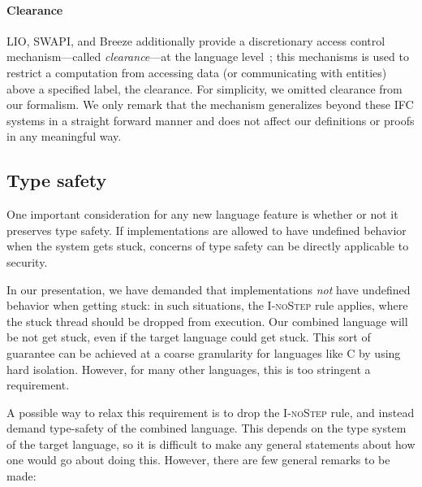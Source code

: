 \paragraph{Clearance}
%
LIO, SWAPI, and Breeze additionally provide a discretionary access
control mechanism---called \emph{clearance}---at the language
level~\cite{Hritcu:2013:YIB:2497621.2498098, lio}; this mechanisms is
used to restrict a computation from accessing data (or communicating
with entities) above a specified label, the clearance.
%
For simplicity, we omitted clearance from our formalism.
%
We only remark that the mechanism generalizes beyond these IFC systems
in a straight forward manner and does not affect our definitions or
proofs in any meaningful way.


\subsection{Type safety}
\label{sec:extensions:types}

One important consideration for any new language feature is whether
or not it preserves type safety.  If implementations are allowed to
have undefined behavior when the system gets stuck, concerns of type
safety can be directly applicable to security.

In our presentation, we have demanded that implementations \emph{not}
have undefined behavior when getting stuck: in such situations, the
\textsc{I-noStep} rule applies, where the stuck thread should be dropped
from execution.  Our combined language will be not get stuck, even if
the target language could get stuck.  This sort of guarantee can be
achieved at a coarse granularity for languages like C by using hard
isolation.  However, for many other languages, this is too stringent a
requirement.

A possible way to relax this requirement is to drop the \textsc{I-noStep}
rule, and instead demand type-safety of the combined language.  This
depends on the type system of the target language, so it is difficult to
make any general statements about how one would go about doing this.  However,
there are few general remarks to be made:

